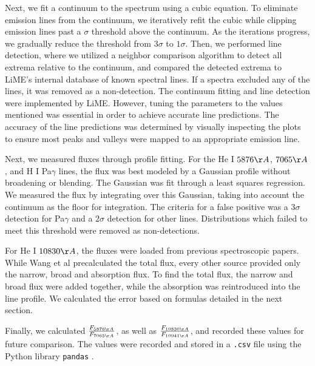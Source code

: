 \documentclass[letterpaper]{aastex701}
\begin{document}
Next, we fit a continuum to the spectrum using a cubic equation. To eliminate emission lines from the continuum, we iteratively refit the cubic while clipping emission lines past a $\sigma$ threshold above the continuum. As the iterations progress, we gradually reduce the threshold from $3\sigma$ to $1\sigma$. Then, we performed line detection, where we utilized a neighbor comparison algorithm to detect all extrema relative to the continuum, and compared the detected extrema to LiME's internal database of known spectral lines. If a spectra excluded any of the lines, it was removed as a non-detection. The continuum fitting and line detection were implemented by LiME. However, tuning the parameters to the values mentioned was essential in order to achieve accurate line predictions. The accuracy of the line predictions was determined by visually inspecting the plots to ensure most peaks and valleys were mapped to an appropriate emission line.

Next, we measured fluxes through profile fitting. For the He I $5876\AA$, $7065\AA$, and H I Pa$\gamma$ lines, the flux was best modeled by a Gaussian profile without broadening or blending. The Gaussian was fit through a least squares regression. We measured the flux by integrating over this Gaussian, taking into account the continuum as the floor for integration. The criteria for a false positive was a $3\sigma$ detection for Pa$\gamma$ and a $2\sigma$ detection for other lines. Distributions which failed to meet this threshold were removed as non-detections.

For He I $10830\AA$, the fluxes were loaded from previous spectroscopic papers. While Wang et al precalculated the total flux, every other source provided only the narrow, broad and absorption flux. To find the total flux, the narrow and broad flux were added together, while the absorption was reintroduced into the line profile. We calculated the error based on formulas detailed in the next section. 

Finally, we calculated $\frac{F_{5876\AA}}{{F_{7065\AA}}}$, as well as $\frac{F_{10830\AA}}{{F_{10941\AA}}}$, and recorded these values for future comparison. The values were recorded and stored in a \texttt{.csv} file using the Python library \texttt{pandas} \citep{reback2020pandas}.
\end{document}
